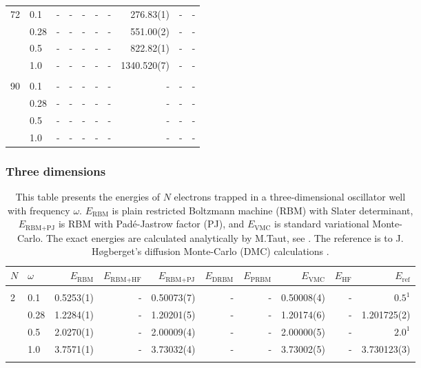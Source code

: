 \begin{landscape}
\begin{table} [H]
\begin{tabularx}{\hsize}{l:l|RRRRRRRR}
		72 & 0.1 & - & - & - & - & - & 276.83(1) & - & - \\ 
		& 0.28 & - & - & - & - & - & 551.00(2) & - & - \\
		& 0.5 & - & - & - & - & - & 822.82(1) & - & - \\
		& 1.0 & - & - & - & - & - & 1340.520(7) & - & - \\ \hdashline \\
		
		90 & 0.1 & - & - & - & - & - & - & - & - \\ 
		& 0.28 & - & - & - & - & - & - & - & - \\
		& 0.5 & - & - & - & - & - & - & - & - \\
		& 1.0 & - & - & - & - & - & - & - & - \\ \hline\hline
	\end{tabularx}
\end{table}

\subsubsection{Three dimensions}
\begin{table} [H]
	\caption{This table presents the energies of $N$ electrons trapped in a three-dimensional oscillator well with frequency $\omega$. $E_{\text{RBM}}$ is plain restricted Boltzmann machine (RBM) with Slater determinant, $E_{\text{RBM+PJ}}$ is RBM with Padé-Jastrow factor (PJ), and $E_{\text{VMC}}$ is standard variational Monte-Carlo. The exact energies are calculated analytically by M.Taut, see \cite{taut_two_1993}. The reference is to J. Høgberget's diffusion Monte-Carlo (DMC) calculations \cite{hogberget_quantum_2013}. } 
	\begin{tabularx}{\hsize}{l:l|RRRRRRRR} \hline\hline
		\label{tab:quantumdotswinteraction3D}
		$N$ & $\omega$ & $E_{\text{RBM}}$ & $E_{\text{RBM+HF}}$ & $E_{\text{RBM+PJ}}$ & $E_{\text{DRBM}}$ & $E_{\text{PRBM}}$ & $E_{\text{VMC}}$ & $E_{\text{HF}} $ & $E_{\text{ref}}$ \\ \hline \\
		2 & 0.1 & 0.5253(1) & - & 0.50073(7) & - & - & 0.50008(4) & - & $0.5^{1}$ \\
		& 0.28 & 1.2284(1) & - & 1.20201(5) & - & - & 1.20174(6) & - & 1.201725(2) \\
		& 0.5 & 2.0270(1) & - & 2.00009(4) & - & - & 2.00000(5) & - & $2.0^{1}$ \\
		& 1.0 & 3.7571(1) & - & 3.73032(4) & - & - & 3.73002(5) & - & 3.730123(3) \\ \hdashline \\
		

\end{tabularx}
\end{table}
\end{landscape}
